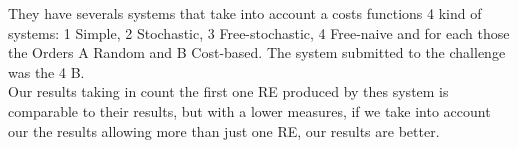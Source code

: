 They have severals systems that take into account a costs functions 4 kind of systems: 1 Simple, 2 Stochastic, 3 Free-stochastic, 4 Free-naive and for each those the Orders A Random and B Cost-based. The system submitted to the challenge was the 4 B.\\

Our results taking in count the first one RE produced by thes system is comparable to their results, but with a lower measures, if we take into account our the results allowing more than just one RE, our results are better.


